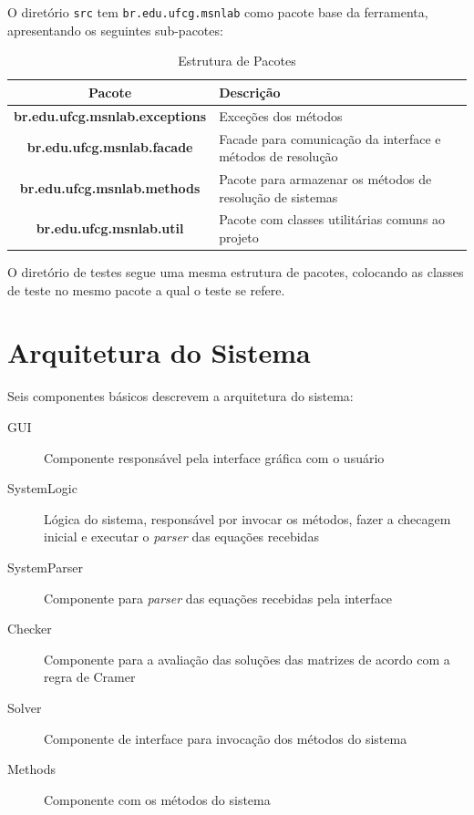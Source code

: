 \documentclass[a4paper,10pt]{report}
\begin{document}
O diretório \texttt{src} tem \texttt{br.edu.ufcg.msnlab} como pacote base da ferramenta, apresentando os seguintes sub-pacotes:

\begin{table}[h]
\centering
\caption{Estrutura de Pacotes}
        \begin{tabular}{|c|p{2in}|}
        \hline
        \textbf{Pacote} & \textbf{Descrição} \\ \hline
        \textbf{br.edu.ufcg.msnlab.exceptions} & Exceções dos métodos \\ \hline
        \textbf{br.edu.ufcg.msnlab.facade} & Facade para comunicação da interface e métodos de resolução \\ \hline
        \textbf{br.edu.ufcg.msnlab.methods} & Pacote para armazenar os métodos de resolução de sistemas \\ \hline
        \textbf{br.edu.ufcg.msnlab.util} & Pacote com classes utilitárias comuns ao projeto \\ \hline
        \end{tabular}
\label{tab:pacotes}
\end{table} 

O diretório de testes segue uma mesma estrutura de pacotes, colocando as classes de teste no mesmo pacote a qual o teste se refere.

\section{Arquitetura do Sistema}

Seis componentes básicos descrevem a arquitetura do sistema:
\begin{description}
 \item[GUI] Componente responsável pela interface gráfica com o usuário
 \item[SystemLogic] Lógica do sistema, responsável por invocar os métodos, fazer a checagem inicial e executar o \textit{parser} das equações recebidas
 \item[SystemParser] Componente para \textit{parser} das equações recebidas pela interface
 \item[Checker] Componente para a avaliação das soluções das matrizes de acordo com a regra de Cramer
 \item[Solver] Componente de interface para invocação dos métodos do sistema
 \item[Methods] Componente com os métodos do sistema
 \end{description}
\end{document}
